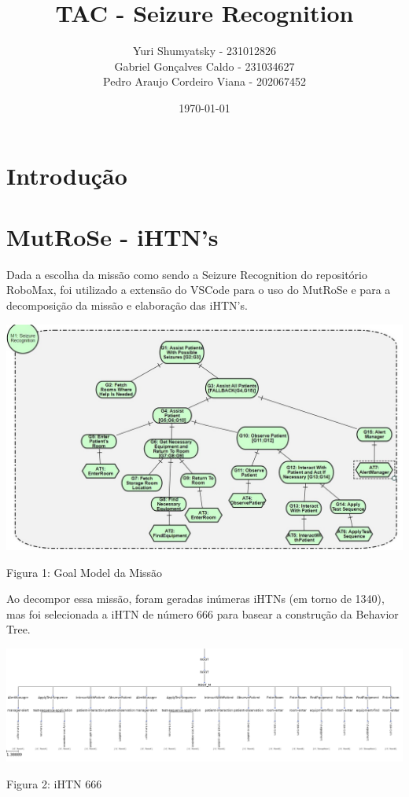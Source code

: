 \documentclass[a4 paper]{article}
\title{TAC - Seizure Recognition}
\author{Yuri Shumyatsky - 231012826\\Gabriel Gonçalves Caldo - 231034627\\Pedro Araujo Cordeiro Viana - 202067452}
\date{\today}
\newcommand{\parag}{\hspace{30pt}}
\begin{document}
\maketitle
\newpage

\section{Introdução}


\section{MutRoSe - iHTN's}
\parag Dada a escolha da missão como sendo a Seizure Recognition do repositório RoboMax, foi utilizado a extensão do VSCode para o uso do MutRoSe e para a decomposição da missão e elaboração das iHTN's. 

\begin{table}[h]
\centering
\includegraphics[scale=0.3]{figuras/gm}
\end{table}
\begin{center}
Figura 1: Goal Model da Missão
\end{center}
\vspace{15pt}

Ao decompor essa missão, foram geradas inúmeras iHTNs (em torno de 1340), mas foi selecionada a iHTN de número $666$ para basear a construção da Behavior Tree.
\vspace{15pt}\vspace{15pt}

\begin{table}[h]
\centering
\includegraphics[scale=0.25]{figuras/ihtn_666}
\end{table}
\begin{center}
Figura 2: iHTN 666
\end{center}
\vspace{30pt}
\end{document}
